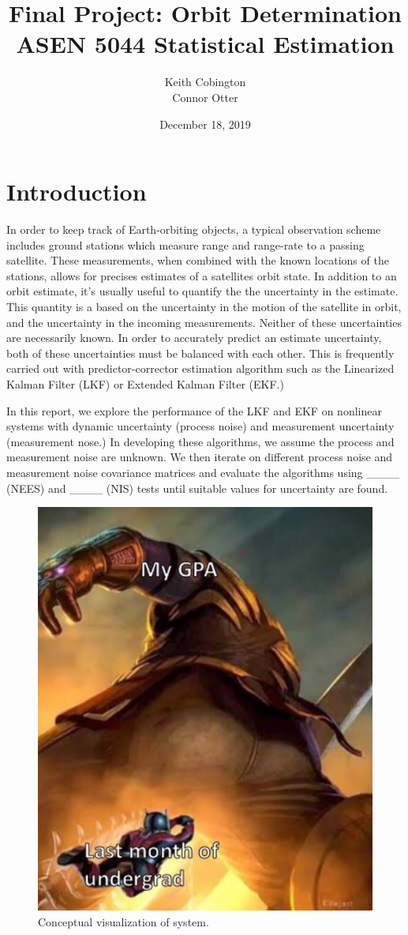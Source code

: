 \documentclass[11pt, a4paper]{article}
\begin{document}
\title{Final Project: Orbit Determination\\ ASEN 5044 Statistical Estimation}
\author{Keith Cobington\\Connor Otter}
\date{December 18, 2019}
\maketitle



\section{Introduction}
In order to keep track of Earth-orbiting objects, a typical observation scheme includes ground stations which measure range and range-rate to a passing satellite. 
These measurements, when combined with the known locations of the stations, allows for precises estimates of a satellites orbit state. 
In addition to an orbit estimate, it's usually useful to quantify the the uncertainty in the estimate. 
This quantity is a based on the uncertainty in the motion of the satellite in orbit, and the uncertainty in the incoming measurements. 
Neither of these uncertainties are necessarily known.
In order to accurately predict an estimate uncertainty, both of these uncertainties must be balanced with each other. 
This is frequently carried out with predictor-corrector estimation algorithm such as the Linearized Kalman Filter (LKF) or Extended Kalman Filter (EKF.)

In this report, we explore the performance of the LKF and EKF on nonlinear systems with dynamic uncertainty (process noise) and measurement uncertainty (measurement nose.) 
In developing these algorithms, we assume the process and measurement noise are unknown.
We then iterate on different process noise and measurement noise covariance matrices and evaluate the algorithms using \_\_\_\_ (NEES) and \_\_\_\_ (NIS) tests until suitable values for uncertainty are found. 


\begin{figure}[H]
	\centering
	\includegraphics[width=.4\textwidth]{./Figures/system_setup.png}
	\caption{Conceptual visualization of system.}
	\label{fig: system}
\end{figure}
\end{document}
